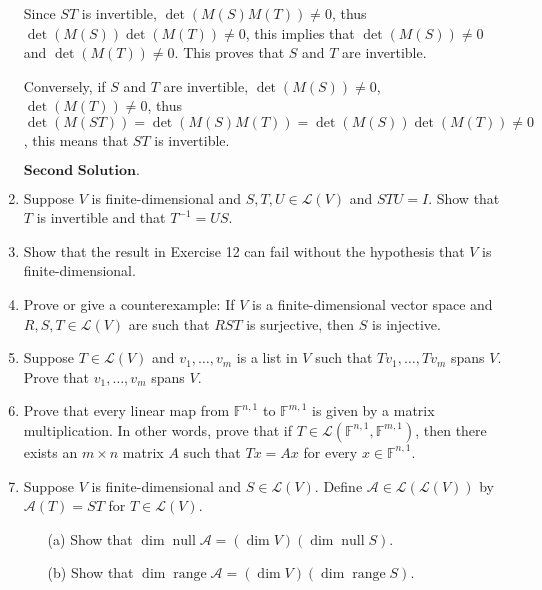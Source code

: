 \documentclass{article}
\theoremstyle{remark}
\begin{document}
\begin{enumerate}
        Since $ST$ is invertible, $\det (M(S)M(T)) \neq 0$, thus $\det(M(S))\det(M(T)) \neq 0$, this implies that $\det(M(S)) \neq 0$ and $\det(M(T)) \neq 0$.
        This proves that $S$ and $T$ are invertible.

        Conversely, if $S$ and $T$ are invertible, $\det(M(S)) \neq 0$, $\det(M(T))\neq 0$, thus $\det (M(ST)) = \det (M(S)M(T)) = \det (M(S))\det(M(T)) \neq 0$, this means that $ST$ is invertible.
        
        $\textbf{Second Solution.}$
        
        \item Suppose $V$ is finite-dimensional and $S, T, U \in \mathcal{L}(V)$ and $STU = I$. Show that $T$ is invertible and that $T^{-1} = US$.
        
        \item Show that the result in Exercise 12 can fail without the hypothesis that $V$ is finite-dimensional.
        
        \item Prove or give a counterexample: If $V$ is a finite-dimensional vector space and $R, S, T \in \mathcal{L}(V)$ are such that $RST$ is surjective, then $S$ is injective.
        
        \item Suppose $T \in \mathcal{L}(V)$ and $v_1, \dots, v_m$ is a list in $V$ such that $T v_1, \dots, T v_m$ spans $V$. Prove that $v_1, \dots, v_m$ spans $V$.
        
        \item Prove that every linear map from $\mathbb{F}^{n,1}$ to $\mathbb{F}^{m,1}$ is given by a matrix multiplication. In other words, prove that if $T \in \mathcal{L}(\mathbb{F}^{n,1}, \mathbb{F}^{m,1})$, then there exists an $m \times n$ matrix $A$ such that $T x = A x$ for every $x \in \mathbb{F}^{n,1}$.
        
        \item Suppose $V$ is finite-dimensional and $S \in \mathcal{L}(V)$. Define $\mathcal{A} \in \mathcal{L}(\mathcal{L}(V))$ by $\mathcal{A}(T) = ST$ for $T \in \mathcal{L}(V)$.
        \begin{enumerate}
            \item[(a)] Show that $\dim \operatorname{null} \mathcal{A} = (\dim V)(\dim \operatorname{null} S)$.
            \item[(b)] Show that $\dim \operatorname{range} \mathcal{A} = (\dim V)(\dim \operatorname{range} S)$.
        \end{enumerate}
        

\end{enumerate}
\end{document}
